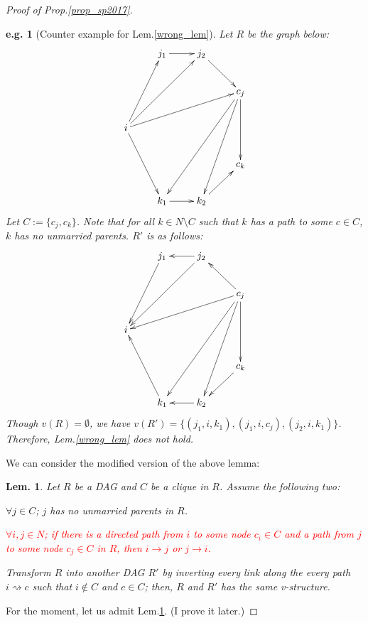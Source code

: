 \documentclass[11pt,a4paper,dvipdfmx]{article}
\theoremstyle{plain}
\newtheorem{lem}{Lem.}[section]
\newtheorem{eg}{e.g.}[section]
\newcommand{\ocomment}[1]{{\textcolor{red}{#1}}}
\begin{document}
\begin{proof}[Proof of Prop.\ref{prop_sp2017}]
	\begin{screen}
	\begin{eg}[Counter example for Lem.\ref{wrong_lem}]
		Let $R$ be the graph below:
		\[
		\xymatrix{
			  & j_1 \ar[r] & j_2 \ar[rd]  &  \\
			  & & & c_j \ar[dd] \ar[llddd] \ar[lddd] \\
			i \ar[ruu] \ar[rruu] \ar[rrru] \ar[rdd] & & & \\
			& & & c_k\\
			& k_1 \ar[r] & k_2 \ar[ru] & 
		}
		\]
		Let $C := \{c_j, c_k\}$. Note that for all $k \in N \setminus C$ such that $k$ has a path to some $c \in C$, $k$ has no unmarried parents. $R'$ is as follows:
		\[
		\xymatrix{
			  & j_1 \ar[ldd] & j_2 \ar[l] \ar[lldd] &  \\
			  & & & c_j \ar[dd] \ar[llddd] \ar[lddd] \ar[llld] \ar[lu] \\
			i  & & & \\
			& & & c_k \ar[ld] \\
			& k_1 \ar[luu] & k_2 \ar[l] & 
		}
		\]
		Though $v(R) = \emptyset$, we have $v(R') = \{(j_1, i, k_1), (j_1, i, c_j), (j_2, i, k_1)\}$. Therefore, Lem.\ref{wrong_lem} does not hold.
	\end{eg}
	\end{screen}
	
	We can consider the modified version of the above lemma:
	\begin{screen}
	\begin{lem} \label{modefied_lem}
	Let $R$ be a DAG and $C$ be a clique in $R$. Assume the following two:
		\begin{enumerate}
			\item $\forall j \in C$; $j$ has no unmarried parents in $R$.
			\ocomment{
			\item $\forall i, j \in N$; if there is a directed path from $i$ to some node $c_i \in C$ and a path from $j$ to some node $c_j \in C$ in $R$, then $i \to j$ or $j \to i$.}
		\end{enumerate}
		Transform $R$ into another DAG $R'$ by inverting every link along the every path $i \rightsquigarrow c$ such that $i \notin C$ and $c \in C$; then, $R$ and $R'$ has the same v-structure.
	\end{lem}
	\end{screen}
	For the moment, let us admit Lem.\ref{modefied_lem}. (I prove it later.)
	

\end{proof}
\end{document}
